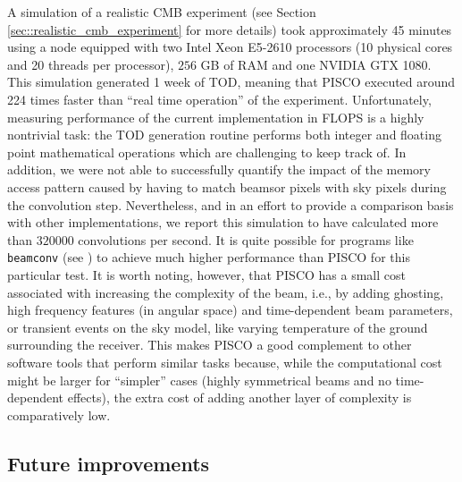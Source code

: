 \documentclass[a4paper,11pt]{article}
\begin{document}
A simulation of a realistic CMB experiment (see Section \ref{sec::realistic_cmb_experiment} for more details) took approximately 45 minutes using a node equipped with two Intel Xeon E5-2610 processors (10 physical cores and 20 threads per processor), $256$ GB of RAM and one NVIDIA GTX 1080. This simulation generated 1 week of TOD, meaning that PISCO executed around 224 times faster than ``real time operation'' of the experiment. Unfortunately, measuring performance of the current implementation in FLOPS is a highly nontrivial task: the TOD generation routine performs both integer and floating point mathematical operations which are challenging to keep track of. In addition, we were not able to successfully quantify the impact of the memory access pattern caused by having to match beamsor pixels with sky pixels during the convolution step. Nevertheless, and in an effort to provide a comparison basis with other implementations, we report this simulation to have calculated more than $320000$ convolutions per second. It is quite possible for programs like \texttt{beamconv} (see \cite{2018arXiv180905034D}) to achieve much higher performance than PISCO for this particular test. It is worth noting, however, that PISCO has a small cost associated with increasing the complexity of the beam, i.e., by adding ghosting, high frequency features (in angular space) and time-dependent beam parameters, or transient events on the sky model, like varying temperature of the ground surrounding the receiver. This makes PISCO a good complement to other software tools that perform similar tasks because, while the computational cost might be larger for ``simpler'' cases (highly symmetrical beams and no time-dependent effects), the extra cost of adding another layer of complexity is comparatively low. %

\subsection{Future improvements}
\end{document}
